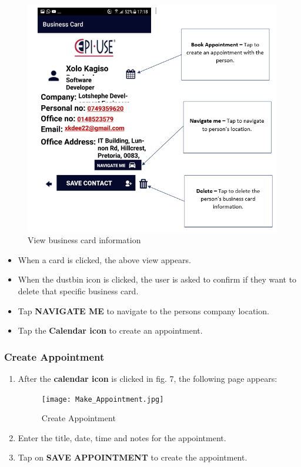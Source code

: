 \documentclass[english]{article}
\begin{document}
		\begin{figure}[H]
			\centering
			\includegraphics[scale=0.5]{person_info.png}
			\caption{View business card information}
			\label{figure: 7}
		\end{figure}
		\begin{itemize}
			\item When a card is clicked, the above view appears.
			\item When the dustbin icon is clicked, the user is asked to confirm if they want to delete that specific business card.
			\item Tap \textbf{NAVIGATE ME} to navigate to the persons company location.
			\item Tap the \textbf{Calendar icon} to create an appointment. 
		\end{itemize}
	\subsubsection{Create Appointment}
		\begin{enumerate}
			\item After the \textbf{calendar icon} is clicked in fig. 7, the following page appears:
			\begin{figure}[H]
				\centering
				\texttt{[image: Make\_Appointment.jpg]}
				\caption{Create Appointment}
				\label{figure: 8}
			\end{figure}
			\item Enter the title, date, time and notes for the appointment.
			\item Tap on \textbf{SAVE APPOINTMENT} to create the appointment.
		\end{enumerate}
		
\end{document}
